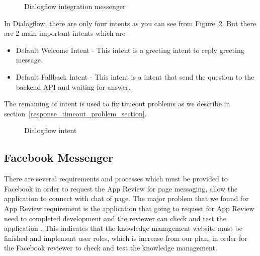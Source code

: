 \documentclass[12pt,oneside,openright,a4paper]{cpe-english-project}
\begin{document}
\begin{figure}[!h]\centering
	\caption{Dialogflow integration messenger}\label{fig:line_example}
\end{figure}
In Dialogflow, there are only four intents as you can see from Figure~\ref*{fig:Dialogflow intent}.
But there are 2 main important intents which are\begin{itemize}
	\item Default Welcome Intent - This intent is a greeting intent to reply greeting message.
	\item Default Fallback Intent - This intent is a intent that send the question to the backend API and waiting for answer.
\end{itemize}

The remaining of intent is used to fix timeout problems as we describe in section~\ref*{response_timeout_problem_section}.

\begin{figure}[!h]\centering
	\caption{Dialogflow intent}\label{fig:Dialogflow intent}
\end{figure}

\pagebreak
\subsection{Facebook Messenger}
\label{fb_messenger}
	There are several requirements and processes which must be
	provided to Facebook in order to request the App Review for page messaging,
	allow the application to connect with chat of page.
	The major problem that we found for App Review requirement is
	the application that going to request for App Review need to completed development and 
	the reviewer can check and test the application \cite{before_you_submit}.
	This indicates that the knowledge management website must be finished and
	implement user roles, which is increase from our plan,
	in order for the Facebook reviewer to check and test the knowledge management.
\end{document}
